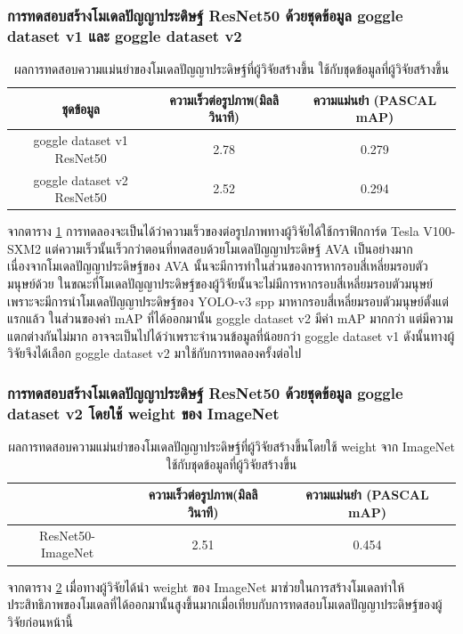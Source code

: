 \subsubsection{การทดสอบสร้างโมเดลปัญญาประดิษฐ์ ResNet50 ด้วยชุดข้อมูล goggle dataset v1 และ goggle dataset v2}
\begin{table}[!ht]
	\centering
	\begin{tabular}{|c|c|c|}
			\hline
			{ชุดข้อมูล}&{ความเร็วต่อรูปภาพ(มิลลิวินาที)}&{ความแม่นยำ (PASCAL mAP)}			\\
			\hline
			goggle dataset v1 ResNet50			& 2.78			& 0.279				\\
			goggle dataset v2 ResNet50			& 2.52			& 0.294				\\
			\hline
	\end{tabular}
\caption{ผลการทดสอบความแม่นยำของโมเดลปัญญาประดิษฐ์ที่ผู้วิจัยสร้างขึ้น ใช้กับชุดข้อมูลที่ผู้วิจัยสร้างขึ้น}
\label{tab: Test PASCAL mAP of dataset created by the researcher}
\end{table}
จากตาราง \ref{tab: Test PASCAL mAP of dataset created by the researcher} การทดลองจะเป็นได้ว่าความเร็วของต่อรูปภาพทางผู้วิจัยได้ใช้กราฟิกการ์ด Tesla V100-SXM2 แต่ความเร็วนั้นเร็วกว่าตอนที่ทดสอบด้วยโมเดลปัญญาประดิษฐ์ AVA เป็นอย่างมาก เนื่องจากโมเดลปัญญาประดิษฐ์ของ AVA นั้นจะมีการทำในส่วนของการหากรอบสี่เหลี่ยมรอบตัวมนุษย์ด้วย ในขณะที่โมเดลปัญญาประดิษฐ์ของผู้วิจัยนั้นจะไม่มีการหากรอบสี่เหลี่ยมรอบตัวมนุษย์ เพราะจะมีการนำโมเดลปัญญาประดิษฐ์ของ YOLO-v3 spp มาหากรอบสี่เหลี่ยมรอบตัวมนุษย์ตั้งแต่แรกแล้ว ในส่วนของค่า mAP ที่ได้ออกมานั้น goggle dataset v2 มีค่า mAP มากกว่า แต่มีความแตกต่างกันไม่มาก อาจจะเป็นไปได้ว่าเพราะจำนวนข้อมูลที่น้อยกว่า goggle dataset v1 ดังนั้นทางผู้วิจัยจึงได้เลือก goggle dataset v2 มาใช้กับการทดลองครั้งต่อไป
\clearpage
\subsubsection{การทดสอบสร้างโมเดลปัญญาประดิษฐ์ ResNet50 ด้วยชุดข้อมูล goggle dataset v2 โดยใช้ weight ของ ImageNet}
\begin{table}[!ht]
	\centering
	\begin{tabular}{|c|c|c|}
			\hline
			{}&{ความเร็วต่อรูปภาพ(มิลลิวินาที)}&{ความแม่นยำ (PASCAL mAP)}			\\
			\hline
			ResNet50-ImageNet			& 2.51			& 0.454				\\
			\hline
	\end{tabular}
\caption{ผลการทดสอบความแม่นยำของโมเดลปัญญาประดิษฐ์ที่ผู้วิจัยสร้างขึ้นโดยใช้ weight จาก ImageNet ใช้กับชุดข้อมูลที่ผู้วิจัยสร้างขึ้น}
\label{tab: Test PASCAL mAP of dataset created by the researcher and pretrain weight imagenet}
\end{table}
จากตาราง \ref{tab: Test PASCAL mAP of dataset created by the researcher and pretrain weight imagenet} เมื่อทางผู้วิจัยได้นำ weight ของ ImageNet มาช่วยในการสร้างโมเดลทำให้ประสิทธิภาพของโมเดลที่ได้ออกมานั้นสูงขึ้นมากเมื่อเทียบกับการทดสอบโมเดลปัญญาประดิษฐ์ของผู้วิจัยก่อนหน้านี้

